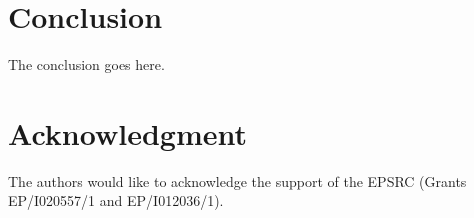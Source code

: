 \documentclass[journal]{IEEEtran}
\begin{document}
\section{Conclusion}
The conclusion goes here.

\section*{Acknowledgment}
The authors would like to acknowledge the support of the EPSRC (Grants EP/I020557/1 and EP/I012036/1).

%
%
%
%





%
%
\end{document}
